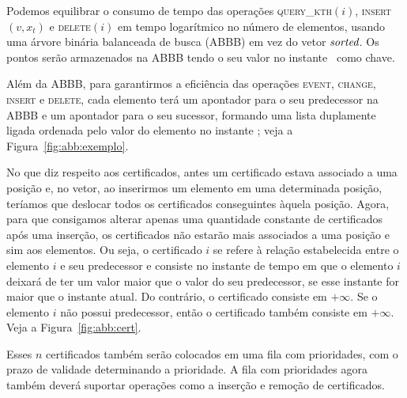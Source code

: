 Podemos equilibrar o consumo de tempo das operações
\textsc{query\_kth}$(i)$, \textsc{insert}$(v, x_t)$ e
\textsc{delete}$(i)$ em tempo logarítmico no número de elementos,
usando uma árvore binária balanceada de busca (ABBB) em vez do vetor $\textit{sorted}$.
Os pontos serão armazenados na ABBB tendo o seu valor no instante \now~como
chave.

Além da ABBB, para garantirmos a eficiência das operações
\textsc{event}, \textsc{change}, \textsc{insert} e \textsc{delete},
cada elemento terá um apontador para o seu predecessor na ABBB e um
apontador para o seu sucessor, formando uma lista duplamente ligada
ordenada pelo valor do elemento no instante \now; veja a Figura~\ref{fig:abb:exemplo}.



No que diz respeito aos certificados, antes um certificado estava
associado a uma posição e, no vetor, ao inserirmos um elemento em
uma determinada posição, teríamos que deslocar %
todos os certificados conseguintes àquela posição.
Agora, para que consigamos alterar apenas uma quantidade constante de certificados
após uma inserção, os certificados não estarão mais associados a uma
posição e sim aos elementos.
Ou seja, o certificado $i$ se refere à relação estabelecida entre o elemento $i$ e seu predecessor
e consiste no instante de tempo em que o elemento $i$ deixará de ter um valor maior que o valor do
seu predecessor, se esse instante for maior que o instante atual.
Do contrário, o certificado consiste em $+\infty$.
Se o elemento $i$ não possui predecessor, então o certificado também consiste em
$+\infty$.
Veja a Figura~\ref{fig:abb:cert}.



Esses $n$ certificados também serão colocados em uma fila com
prioridades, com o prazo de validade determinando a prioridade.
A fila com prioridades agora também deverá suportar operações
como a inserção e remoção de certificados.

